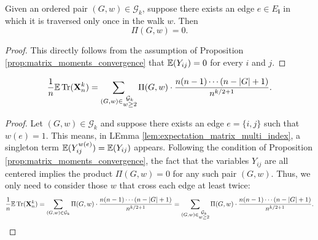 \begin{lemma}
  \label{lem:Pi.prod_eq_zero_if_w_le_two}
  Given an ordered pair $(G,w) \in \mathcal{G}_k$, suppose there exists an edge $e \in E_\mathbf{i}$ in which it is traversed only once in the walk $w$. Then
  \[
  \Pi (G,w) = 0.
  \]
\end{lemma}
\begin{proof}
  This directly follows from the assumption of Proposition \ref{prop:matrix_moments_convergence} that ${\mathbb{E}} (Y_{ij}) = 0$ for every $i$ and $j$. 
\end{proof}
\begin{lemma}
  \label{lem:equation_4.8}
  \[
  \frac{1}{n} {\mathbb{E}} \operatorname{Tr} (\mathbf{X}_n^k) 
  = \sum_{(G,w) \in \substack{\mathcal{G}_k \\ w \geq 2}} \Pi (G,w) \cdot \frac{n (n-1) \cdots (n - |G| + 1)}{n^{k/2+1}}.
  \]
\end{lemma}
\begin{proof}
  Let $(G,w) \in \mathcal{G}_k$ and suppose there exists an edge $e = \{i,j\}$ such that $w(e) = 1$.
  This means, in LEmma \ref{lem:expectation_matrix_multi_index}, a singleton term ${\mathbb{E}} (Y_{ij}^{w(e)}) = {\mathbb{E}} (Y_{ij})$ appears.
  Following the condition of Proposition \ref{prop:matrix_moments_convergence}, the fact that the variables $Y_{ij}$ are all centered implies the product $\Pi (G,w) = 0$ for any such pair $(G,w)$.
  Thus, we only need to consider those $w$ that cross each edge at least twice: 
  \[
  \frac{1}{n} {\mathbb{E}} \operatorname{Tr} (\mathbf{X}_n^k) = \sum_{\substack{(G,w) \in \mathcal{G}_k}} \Pi (G,w) \cdot \frac{n (n-1) \cdots (n - |G| + 1)}{n^{k/2+1}}  = \sum_{(G,w) \in \substack{\mathcal{G}_k \\ w \geq 2}} \Pi (G,w) \cdot \frac{n (n-1) \cdots (n - |G| + 1)}{n^{k/2+1}}.
  \]
\end{proof}
